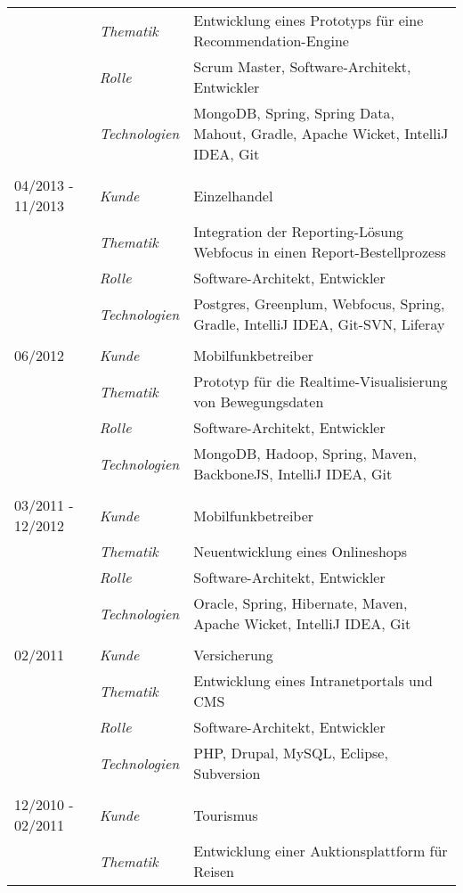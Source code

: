 \begin{longtable}{@{}>{}p{4cm}>{\itshape}p{2cm}>{}p{9cm}}
\nopagebreak		& Thematik	    & Entwicklung eines Prototyps für eine Recommendation-Engine\\
\nopagebreak		& Rolle 	    & Scrum Master, Software-Architekt, Entwickler\\
\nopagebreak		& Technologien	& MongoDB, Spring, Spring Data, Mahout, Gradle, Apache Wicket, IntelliJ IDEA, Git\\
\\
04/2013 - 11/2013     & Kunde 	    & Einzelhandel\\
\nopagebreak		& Thematik	    & Integration der Reporting-Lösung Webfocus in einen Report-Bestellprozess\\
\nopagebreak		& Rolle 	    & Software-Architekt, Entwickler\\
\nopagebreak		& Technologien	& Postgres, Greenplum, Webfocus, Spring, Gradle, IntelliJ IDEA, Git-SVN, Liferay\\
\\
06/2012             & Kunde 	    & Mobilfunkbetreiber\\
\nopagebreak		& Thematik	    & Prototyp für die Realtime-Visualisierung von Bewegungsdaten \\
\nopagebreak		& Rolle 	    & Software-Architekt, Entwickler\\
\nopagebreak		& Technologien	& MongoDB, Hadoop, Spring, Maven, BackboneJS, IntelliJ IDEA, Git\\
\\
03/2011 - 12/2012     & Kunde 	    & Mobilfunkbetreiber\\
\nopagebreak		& Thematik	    & Neuentwicklung eines Onlineshops \\
\nopagebreak		& Rolle 	    & Software-Architekt, Entwickler\\
\nopagebreak		& Technologien	& Oracle, Spring, Hibernate, Maven, Apache Wicket, IntelliJ IDEA, Git\\
\\
02/2011             & Kunde 	    & Versicherung\\
\nopagebreak		& Thematik	    & Entwicklung eines Intranetportals und CMS\\
\nopagebreak		& Rolle 	    & Software-Architekt, Entwickler\\
\nopagebreak		& Technologien	& PHP, Drupal, MySQL, Eclipse, Subversion\\
\\
12/2010 - 02/2011     & Kunde 	    & Tourismus\\
\nopagebreak		& Thematik	    & Entwicklung einer Auktionsplattform für Reisen\\

\end{longtable}
